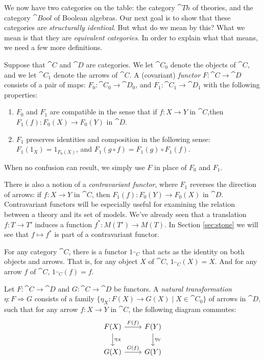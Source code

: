 We now have two categories on the table: the category $\cat{Th}$ of
theories, and the category $\cat{Bool}$ of Boolean algebras.  Our next
goal is to show that these categories are \emph{structurally
  identical}.  But what do we mean by this?  What we mean is that they
are \emph{equivalent categories}.  In order to explain what that
means, we need a few more definitions.


\begin{defn} Suppose that $\cat{C}$ and $\cat{D}$ are categories.  We
  let $\cat{C}_0$ denote the objects of $\cat{C}$, and we let
  $\cat{C}_1$ denote the arrows of $\cat{C}$.  A (covariant)
  \emph{functor} $F:\cat{C}\to\cat{D}$ consists of a pair of maps:
  $F_0:\cat{C}_0\to\cat{D}_0$, and $F_1:\cat{C}_1\to\cat{D}_1$ with
  the following properties:
  \begin{enumerate} 
  \item $F_0$ and $F_1$ are compatible in the sense that if $f:X\to Y$
    in $\cat{C}$,then $F_1(f):F_0(X)\to F_0(Y)$ in $\cat{D}$.
  \item $F_1$ preserves identities and composition in the following
    sense: $F_1(1_X)=1_{F_0(X)}$, and $F_1(g\circ f)=F_1(g)\circ
    F_1(f)$.
\end{enumerate}
When no confusion can result, we simply use $F$ in place of $F_0$ and
$F_1$.
\end{defn}

\begin{note} There is also a notion of a \emph{contravariant functor},
  where $F_1$ reverses the direction of arrows: if $f:X\to Y$ in
  $\cat{C}$, then $F_1(f):F_0(Y)\to F_0(X)$ in $\cat{D}$.
  Contravariant functors will be especially useful for examining the
  relation between a theory and its set of models.  We've already seen
  that a translation $f:T\to T'$ induces a function
  $f^*:M(T')\to M(T)$.  In Section \ref{sec:stone} we will see that
  $f\mapsto f^*$ is part of a contravariant functor. \end{note}

\begin{example} For any category $\cat{C}$, there is a functor
  $1_{\cat{C}}$ that acts as the identity on both objects and arrows.
  That is, for any object $X$ of $\cat{C}$, $1_{\cat{C}}(X)=X$.  And
  for any arrow $f$ of $\cat{C}$, $1_{\cat{C}}(f)=f$. \end{example}

\begin{defn} Let $F:\cat{C}\to \cat{D}$ and $G:\cat{C}\to \cat{D}$ be
  functors.  A \emph{natural transformation} $\eta :F\Rightarrow G$
  consists of a family $\{ \eta _X:F(X)\to G(X) \mid X\in \cat{C}_0
  \}$ of arrows in $\cat{D}$, such that for any arrow $f:X\to Y$ in
  $\cat{C}$, the following diagram commutes:
  \[ \begin{tikzcd} F(X) \arrow[r,"F(f)"] \arrow[d,"\eta _X"] & F(Y)
    \arrow[d,"\eta _Y"]
    \\
    G(X) \arrow[r,"G(f)"] & G(Y) \end{tikzcd} \] \end{defn}

